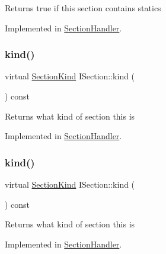 Returns {\ttfamily true} if this section contains statics 

Implemented in \mbox{\hyperlink{class_section_handler_a35d5f2bf1c1d2419934e50e370bd5088}{Section\+Handler}}.

\mbox{\label{class_i_section_a3610cc0bc9b90608ade62b84a750ddb4}} 
\subsubsection{\texorpdfstring{kind()}{kind()}\hspace{0.1cm}{\footnotesize\ttfamily [1/2]}}
{\footnotesize\ttfamily virtual \mbox{\hyperlink{class_i_section_af768cbfe7056fadbd0a67d26d0ef84e5}{Section\+Kind}} I\+Section\+::kind (\begin{DoxyParamCaption}{ }\end{DoxyParamCaption}) const\hspace{0.3cm}{\ttfamily [pure virtual]}}

Returns what kind of section this is 

Implemented in \mbox{\hyperlink{class_section_handler_a09b0046032fbbb4189c2d5dd016475b8}{Section\+Handler}}.

\mbox{\label{class_i_section_a3610cc0bc9b90608ade62b84a750ddb4}} 
\subsubsection{\texorpdfstring{kind()}{kind()}\hspace{0.1cm}{\footnotesize\ttfamily [2/2]}}
{\footnotesize\ttfamily virtual \mbox{\hyperlink{class_i_section_af768cbfe7056fadbd0a67d26d0ef84e5}{Section\+Kind}} I\+Section\+::kind (\begin{DoxyParamCaption}{ }\end{DoxyParamCaption}) const\hspace{0.3cm}{\ttfamily [pure virtual]}}

Returns what kind of section this is 

Implemented in \mbox{\hyperlink{class_section_handler_a09b0046032fbbb4189c2d5dd016475b8}{Section\+Handler}}.

\mbox{\label{class_i_section_ad4027ec4d324a2ee4987f3216e225fdb}} 
